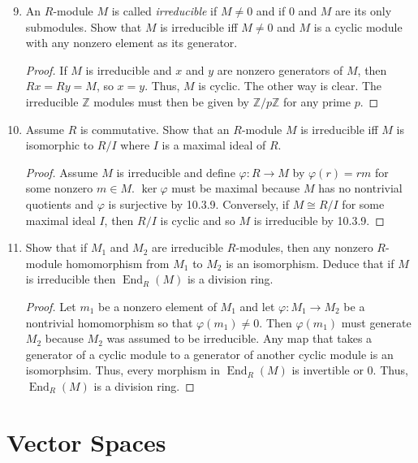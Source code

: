 \documentclass{report}
\newcommand{\Z}{\mathbb{Z}}
\DeclareMathOperator{\End}{End}
\begin{document}
\begin{enumerate}
		\setcounter{enumi}{8}
	\item An $R$-module $M$ is called \textit{irreducible} if $M\neq 0$ and if $0$ and $M$ are its only submodules.
		Show that $M$ is irreducible iff $M\neq 0$ and $M$ is a cyclic module with any nonzero element as its generator.
		\begin{proof}
			If $M$ is irreducible and $x$ and $y$ are nonzero generators of $M$, then $Rx=Ry=M$, so $x=y$. Thus, $M$ is cyclic. The other way is clear.
			The irreducible $\Z$ modules must then be given by $\Z /p\Z$ for any prime $p$.
		\end{proof}
	\item Assume $R$ is commutative. Show that an $R$-module $M$ is irreducible iff $M$ is isomorphic to $R / I$ where $I$ is a maximal ideal of $R$.
		\begin{proof}
			Assume $M$ is irreducible and define $\varphi:R\to M$ by $\varphi(r)=rm$ for some nonzero $m\in M$.
			$\ker\varphi$ must be maximal because $M$ has no nontrivial quotients and $\varphi$ is surjective by 10.3.9.
			Conversely, if $M\cong R / I$ for some maximal ideal $I$, then $R / I$ is cyclic and so $M$ is irreducible by 10.3.9.
		\end{proof}
	\item Show that if $M_1$ and $M_2$ are irreducible $R$-modules, then any nonzero $R$-module homomorphism from $M_1$ to $M_2$ is an isomorphism.
		Deduce that if $M$ is irreducible then $\End_R(M)$ is a division ring.
		\begin{proof}
			Let $m_1$ be a nonzero element of $M_1$ and let $\varphi:M_1\to M_2$ be a nontrivial homomorphism so that $\varphi(m_1)\neq 0$.
			Then $\varphi(m_1)$ must generate $M_2$ because $M_2$ was assumed to be irreducible. Any map that takes a generator of a cyclic module to a generator of another cyclic module is an isomorphsim.
			Thus, every morphism in $\End_R(M)$ is invertible or $0$. Thus, $\End_R(M)$ is a division ring.
		\end{proof}
		
\end{enumerate}

\chapter{Vector Spaces}
\end{document}
